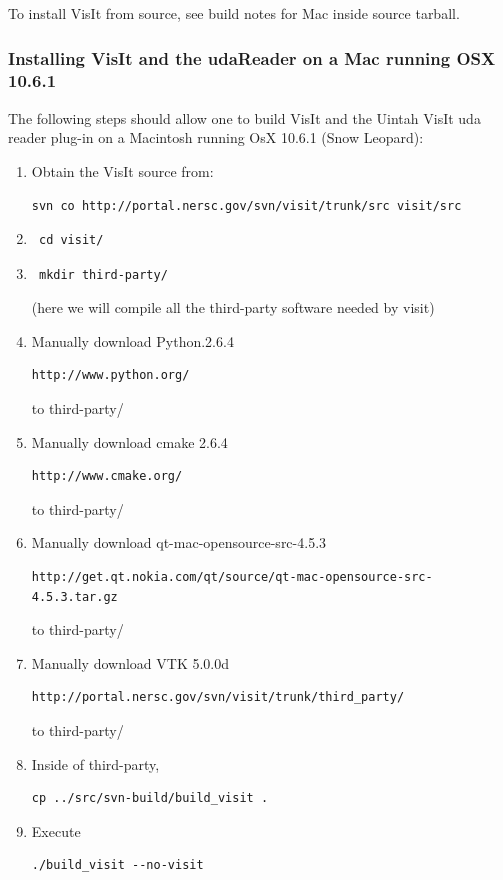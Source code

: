 \documentclass[12pt]{article}
\begin{document}
To install VisIt from source, see build notes for Mac inside source
tarball.

\subsubsection{Installing VisIt and the udaReader on a Mac running OSX 10.6.1}

The following steps should allow one to build VisIt and the Uintah VisIt uda reader plug-in on a Macintosh running OsX 10.6.1 (Snow Leopard):
%
\begin{enumerate}
\item Obtain the VisIt source from:
\begin{verbatim}
svn co http://portal.nersc.gov/svn/visit/trunk/src visit/src
\end{verbatim}
\item \begin{verbatim} cd visit/ \end{verbatim}
\item \begin{verbatim} mkdir third-party/ \end{verbatim} (here we will compile all the third-party software needed by visit)
\item Manually download Python.2.6.4 
\begin{verbatim}
http://www.python.org/
\end{verbatim}
to third-party/
\item Manually download cmake 2.6.4 
\begin{verbatim}
http://www.cmake.org/
\end{verbatim}
to third-party/
\item Manually download qt-mac-opensource-src-4.5.3 
\begin{verbatim}
http://get.qt.nokia.com/qt/source/qt-mac-opensource-src-4.5.3.tar.gz
\end{verbatim}
to third-party/
\item Manually download VTK 5.0.0d 
\begin{verbatim}
http://portal.nersc.gov/svn/visit/trunk/third_party/
\end{verbatim}
to third-party/
\item Inside of third-party,
\begin{verbatim}
cp ../src/svn-build/build_visit . 
\end{verbatim}
\item Execute
\begin{verbatim}
./build_visit --no-visit 

\end{verbatim}
\end{enumerate}
\end{document}

